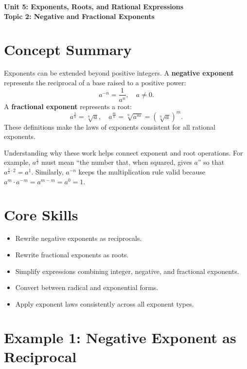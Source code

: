 \documentclass[14pt]{extarticle}
\begin{document}
\raggedright
{}

\begin{center}
    \LARGE \textbf{Unit 5: Exponents, Roots, and Rational Expressions} \\[6pt]
    \Large \textbf{Topic 2: Negative and Fractional Exponents}
\end{center}

\vspace{1em}

\section*{Concept Summary}

Exponents can be extended beyond positive integers.  
A \textbf{negative exponent} represents the reciprocal of a base raised to a positive power:
\[
a^{-n} = \frac{1}{a^n}, \quad a \ne 0.
\]
A \textbf{fractional exponent} represents a root:
\[
a^{\frac{1}{n}} = \sqrt[n]{a}, \quad a^{\frac{m}{n}} = \sqrt[n]{a^m} = (\sqrt[n]{a})^m.
\]
These definitions make the laws of exponents consistent for all rational exponents.

Understanding why these work helps connect exponent and root operations.  
For example, \(a^{\frac{1}{2}}\) must mean “the number that, when squared, gives \(a\)” so that \(a^{\frac{1}{2}\cdot 2} = a^1\).  
Similarly, \(a^{-n}\) keeps the multiplication rule valid because \(a^m \cdot a^{-m} = a^{m-m} = a^0 = 1.\)

\section*{Core Skills}
\begin{itemize}
  \item Rewrite negative exponents as reciprocals.
  \item Rewrite fractional exponents as roots.
  \item Simplify expressions combining integer, negative, and fractional exponents.
  \item Convert between radical and exponential forms.
  \item Apply exponent laws consistently across all exponent types.
\end{itemize}

\section*{Example 1: Negative Exponent as Reciprocal}
\end{document}
